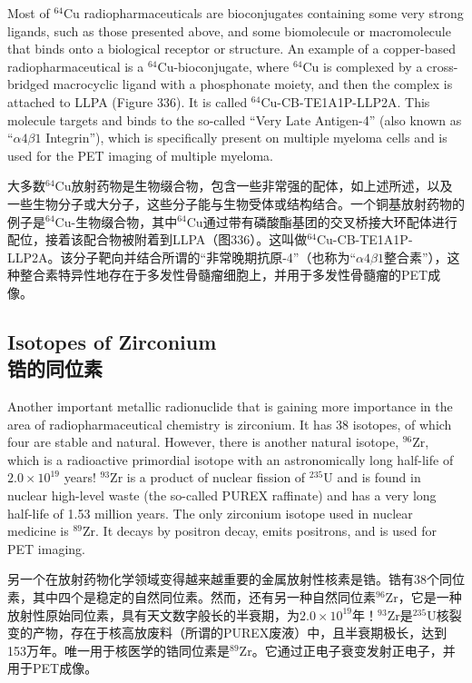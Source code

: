 \documentclass[dvipsnames, svgnames,a4paper,11pt]{article}
\begin{document}
Most of \(\mathrm{^{64}Cu}\) radiopharmaceuticals are bioconjugates containing some very strong ligands, such as those presented above, and some biomolecule or macromolecule that binds onto a biological receptor or structure. An example of a copper-based radiopharmaceutical is a \(\mathrm{^{64}Cu}\)-bioconjugate, where \(\mathrm{^{64}Cu}\) is complexed by a cross-bridged macrocyclic ligand with a phosphonate moiety, and then the complex is attached to LLPA (Figure 336). It is called \(\mathrm{^{64}Cu}\)-CB-TE1A1P-LLP2A. This molecule targets and binds to the so-called “Very Late Antigen-4” (also known as “\(\alpha4\beta1\) Integrin”), which is specifically present on multiple myeloma cells and is used for the PET imaging of multiple myeloma.  

大多数\(\mathrm{^{64}Cu}\)放射药物是生物缀合物，包含一些非常强的配体，如上述所述，以及一些生物分子或大分子，这些分子能与生物受体或结构结合。一个铜基放射药物的例子是\(\mathrm{^{64}Cu}\)-生物缀合物，其中\(\mathrm{^{64}Cu}\)通过带有磷酸酯基团的交叉桥接大环配体进行配位，接着该配合物被附着到LLPA（图336）。这叫做\(\mathrm{^{64}Cu}\)-CB-TE1A1P-LLP2A。该分子靶向并结合所谓的“非常晚期抗原-4”（也称为“\(\alpha4\beta1\)整合素”），这种整合素特异性地存在于多发性骨髓瘤细胞上，并用于多发性骨髓瘤的PET成像。  

\subsection{Isotopes of Zirconium\\ 锆的同位素}  
Another important metallic radionuclide that is gaining more importance in the area of radiopharmaceutical chemistry is zirconium. It has 38 isotopes, of which four are stable and natural. However, there is another natural isotope, \(\mathrm{^{96}Zr}\), which is a radioactive primordial isotope with an astronomically long half-life of \(2.0 \times 10^{19}\) years! \(\mathrm{^{93}Zr}\) is a product of nuclear fission of \(\mathrm{^{235}U}\) and is found in nuclear high-level waste (the so-called PUREX raffinate) and has a very long half-life of 1.53 million years. The only zirconium isotope used in nuclear medicine is \(\mathrm{^{89}Zr}\). It decays by positron decay, emits positrons, and is used for PET imaging.

另一个在放射药物化学领域变得越来越重要的金属放射性核素是锆。锆有38个同位素，其中四个是稳定的自然同位素。然而，还有另一种自然同位素\(\mathrm{^{96}Zr}\)，它是一种放射性原始同位素，具有天文数字般长的半衰期，为\(2.0 \times 10^{19}\)年！\(\mathrm{^{93}Zr}\)是\(\mathrm{^{235}U}\)核裂变的产物，存在于核高放废料（所谓的PUREX废液）中，且半衰期极长，达到153万年。唯一用于核医学的锆同位素是\(\mathrm{^{89}Zr}\)。它通过正电子衰变发射正电子，并用于PET成像。
\end{document}
